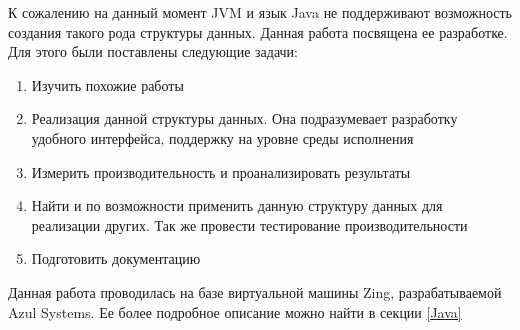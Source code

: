 К сожалению на данный момент JVM и язык Java не поддерживают возможность создания такого рода структуры данных. Данная работа посвящена ее разработке. Для этого были поставлены следующие задачи: 
\begin{enumerate}
	\item Изучить похожие работы
	\item Реализация данной структуры данных. Она подразумевает разработку удобного интерфейса, поддержку на уровне среды исполнения
	\item Измерить производительность и проанализировать результаты
	\item Найти и по возможности применить данную структуру данных для реализации других. Так же провести тестирование производительности
	\item Подготовить документацию  
\end{enumerate}
Данная работа проводилась на базе виртуальной машины Zing, разрабатываемой Azul Systems. Ее более подробное описание можно найти в секции \ref{Java}

\clearpage